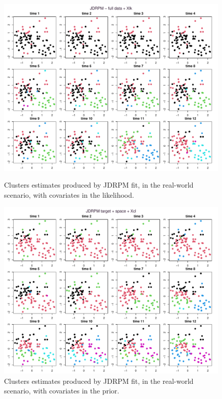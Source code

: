 \documentclass[12pt,	%
	a4paper,		%
	twoside,		%
	openright,		%
	titlepage,%
	]{book}
\theoremstyle{definition}
\begin{document}
\begin{figure}[!ht]
\centering
    \includegraphics[clip, trim=8pt 2pt 8pt 23pt,width=1\linewidth]{Testing/Covariates/NA lk improvement/fitJDRPM - full data + Xlk_simple_map.pdf}
    \caption[Clusters estimates of JDRPM, real-world scenario, covariates in the likelihood]{Clusters estimates produced by JDRPM fit, in the real-world scenario, with covariates in the likelihood.\vspace{5pt}}
    \label{fig:clusters visualized JDRPM space Xlk}
     \includegraphics[clip, trim=8pt 2pt 8pt 23pt,width=1\linewidth]{Testing/Covariates/in clustering/space J Xcl/fitJDRPM target + space + Xcl_simple_map.pdf}
    \caption[Clusters estimates of JDRPM, real-world scenario, covariates in the prior]{Clusters estimates produced by JDRPM fit, in the real-world scenario, with covariates in the prior.}
    \label{fig:clusters visualized JDRPM space Xcl}
\end{figure}
\end{document}
